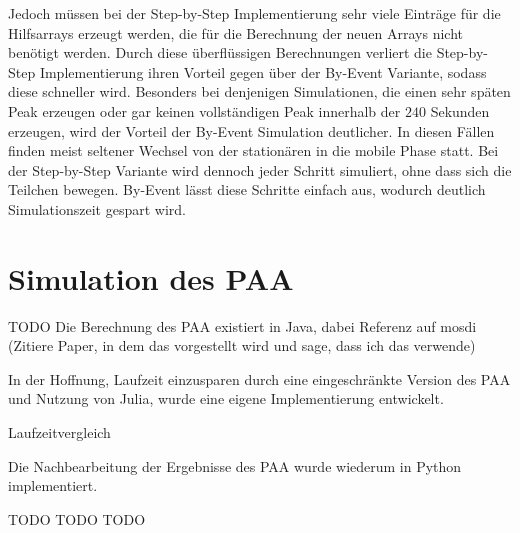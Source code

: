 Jedoch müssen bei der Step-by-Step Implementierung sehr viele Einträge für die Hilfsarrays erzeugt werden, die für die Berechnung der neuen Arrays nicht benötigt werden. Durch diese überflüssigen Berechnungen verliert die Step-by-Step Implementierung ihren Vorteil gegen über der By-Event Variante, sodass diese schneller wird. Besonders bei denjenigen Simulationen, die einen sehr späten Peak erzeugen oder gar keinen vollständigen Peak innerhalb der $240$ Sekunden erzeugen, wird der Vorteil der By-Event Simulation deutlicher. In diesen Fällen finden meist seltener Wechsel von der stationären in die mobile Phase statt. Bei der Step-by-Step Variante wird dennoch jeder Schritt simuliert, ohne dass sich die Teilchen bewegen. By-Event lässt diese Schritte einfach aus, wodurch deutlich Simulationszeit gespart wird. 



\section{Simulation des PAA}
TODO
Die Berechnung des PAA existiert in Java, dabei Referenz auf mosdi (Zitiere Paper, in dem das vorgestellt wird und sage, dass ich das verwende)

In der Hoffnung, Laufzeit einzusparen durch eine eingeschränkte Version des PAA und Nutzung von Julia, wurde eine eigene Implementierung entwickelt.



Laufzeitvergleich

Die Nachbearbeitung der Ergebnisse des PAA wurde wiederum in Python implementiert.

TODO TODO TODO


